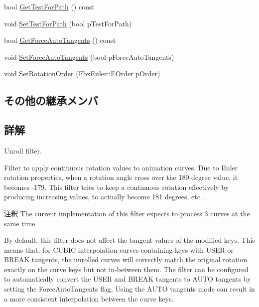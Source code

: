 \begin{DoxyCompactItemize}
\item 
bool \hyperlink{class_fbx_anim_curve_filter_unroll_af073ba1c941aca18f6ba62a811bf8a02}{Get\+Test\+For\+Path} () const
\item 
void \hyperlink{class_fbx_anim_curve_filter_unroll_af87dabf0628d09c9864ed445f11f8c66}{Set\+Test\+For\+Path} (bool p\+Test\+For\+Path)
\item 
bool \hyperlink{class_fbx_anim_curve_filter_unroll_a0d60638cd87eb0848e7995a42832fca4}{Get\+Force\+Auto\+Tangents} () const
\item 
void \hyperlink{class_fbx_anim_curve_filter_unroll_ae4d857f9f855136c18103315e473bbc3}{Set\+Force\+Auto\+Tangents} (bool p\+Force\+Auto\+Tangents)
\item 
void \hyperlink{class_fbx_anim_curve_filter_unroll_a8332667ca1dba9998d511f5e25f6cfb2}{Set\+Rotation\+Order} (\hyperlink{class_fbx_euler_a7d5bec7eedb022b4dae56894ab7a9939}{Fbx\+Euler\+::\+E\+Order} p\+Order)
\end{DoxyCompactItemize}
\subsection*{その他の継承メンバ}


\subsection{詳解}
Unroll filter.

Filter to apply continuous rotation values to animation curves. Due to Euler rotation properties, when a rotation angle cross over the 180 degree value, it becomes -\/179. This filter tries to keep a continuous rotation effectively by producing increasing values, to actually become 181 degrees, etc... \begin{DoxyRemark}{注釈}
The current implementation of this filter expects to process 3 curves at the same time. 

By default, this filter does not affect the tangent values of the modified keys. This means that, for C\+U\+B\+IC interpolation curves containing keys with U\+S\+ER or B\+R\+E\+AK tangents, the unrolled curves will correctly match the original rotation exactly on the curve keys but not in-\/between them. The filter can be configured to automatically convert the U\+S\+ER and B\+R\+E\+AK tangents to A\+U\+TO tangents by setting the Force\+Auto\+Tangents flag. Using the A\+U\+TO tangents mode can result in a more consistent interpolation between the curve keys. 
\end{DoxyRemark}


